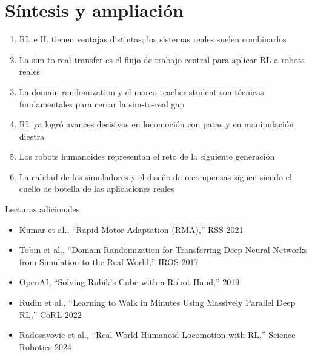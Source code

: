\section{Síntesis y ampliación}

\begin{enumerate}
    \item RL e IL tienen ventajas distintas; los sistemas reales suelen combinarlos
    \item La sim-to-real transfer es el flujo de trabajo central para aplicar RL a robots reales
    \item La domain randomization y el marco teacher-student son técnicas fundamentales para cerrar la sim-to-real gap
    \item RL ya logró avances decisivos en locomoción con patas y en manipulación diestra
    \item Los robots humanoides representan el reto de la siguiente generación
    \item La calidad de los simuladores y el diseño de recompensas siguen siendo el cuello de botella de las aplicaciones reales
\end{enumerate}

\begin{knowledgebox}{Lecturas adicionales}
\begin{itemize}
    \item Kumar et al., ``Rapid Motor Adaptation (RMA),'' RSS 2021
    \item Tobin et al., ``Domain Randomization for Transferring Deep Neural Networks from Simulation to the Real World,'' IROS 2017
    \item OpenAI, ``Solving Rubik's Cube with a Robot Hand,'' 2019
    \item Rudin et al., ``Learning to Walk in Minutes Using Massively Parallel Deep RL,'' CoRL 2022
    \item Radosavovic et al., ``Real-World Humanoid Locomotion with RL,'' Science Robotics 2024
\end{itemize}
\end{knowledgebox}


